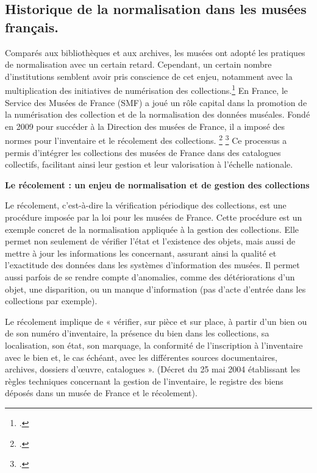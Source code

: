 \subsection{Historique de la normalisation dans les musées français.}
Comparés aux bibliothèques et aux archives, les musées ont adopté les pratiques de normalisation avec un certain retard. Cependant, un certain nombre d’institutions semblent avoir pris conscience de cet enjeu, notamment avec la multiplication des initiatives de numérisation des collections.\footcite{numerisation} En France, le Service des Musées de France (SMF) a joué un rôle capital dans la promotion de la numérisation des collection et de la normalisation des données muséales. Fondé en 2009 pour succéder à la Direction des musées de France, il a imposé des normes pour l’inventaire et le récolement des collections. \footcite{art_4_2020} \footcite{loi_2002} Ce processus a permis d’intégrer les collections des musées de France dans des catalogues collectifs, facilitant ainsi leur gestion et leur valorisation à l’échelle nationale.\newline

\textbf{Le récolement : un enjeu de normalisation et de gestion des collections}\newline

Le récolement, c’est-à-dire la vérification périodique des collections, est une procédure imposée par la loi pour les musées de France. Cette procédure est un exemple concret de la normalisation appliquée à la gestion des collections. Elle permet non seulement de vérifier l’état et l’existence des objets, mais aussi de mettre à jour les informations les concernant, assurant ainsi la qualité et l’exactitude des données dans les systèmes d’information des musées. Il permet aussi parfois de se rendre compte d’anomalies, comme des détériorations d’un objet, une disparition, ou un manque d’information (pas d’acte d’entrée dans les collections par exemple).\newline

Le récolement implique de « vérifier, sur pièce et sur place, à partir d'un bien ou de son numéro d'inventaire, la présence du bien dans les collections, sa localisation, son état, son marquage, la conformité de l'inscription à l'inventaire avec le bien et, le cas échéant, avec les différentes sources documentaires, archives, dossiers d'œuvre, catalogues ». (Décret du 25 mai 2004 établissant les règles techniques concernant la gestion de l'inventaire, le registre des biens déposés dans un musée de France et le récolement).\newline

